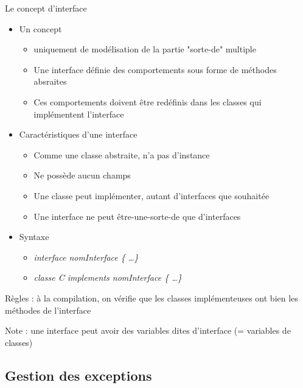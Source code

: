 \documentclass{article}
\begin{document}
Le concept d'interface

\begin{itemize}
	\item Un concept
	\begin{itemize}
		\item uniquement de modélisation de la partie "sorte-de" multiple
		\item Une interface définie des comportements sous forme de
méthodes absraites
		\item Ces comportements doivent être redéfinis dans les classes qui implémentent
l’interface
	\end{itemize}
	\item Caractéristiques d’une interface
	\begin{itemize}
		\item Comme une classe abstraite, n’a pas d’instance
		\item Ne possède aucun champs
		\item Une classe peut implémenter, autant d’interfaces que souhaitée
		\item Une interface ne peut être-une-sorte-de que d'interfaces
	\end{itemize}
	\item Syntaxe
	\begin{itemize}
		\item \emph{interface nomInterface \{ \dots \} }
		\item \emph{classe C implements nomInterface \{ \dots \}}
	\end{itemize}
\end{itemize}

Règles : à la compilation, on vérifie que les classes implémenteuses
ont bien les méthodes de l’interface

Note : une interface peut avoir des variables dites d’interface (= variables
de classes)

\subsection{Gestion des exceptions}
\end{document}
